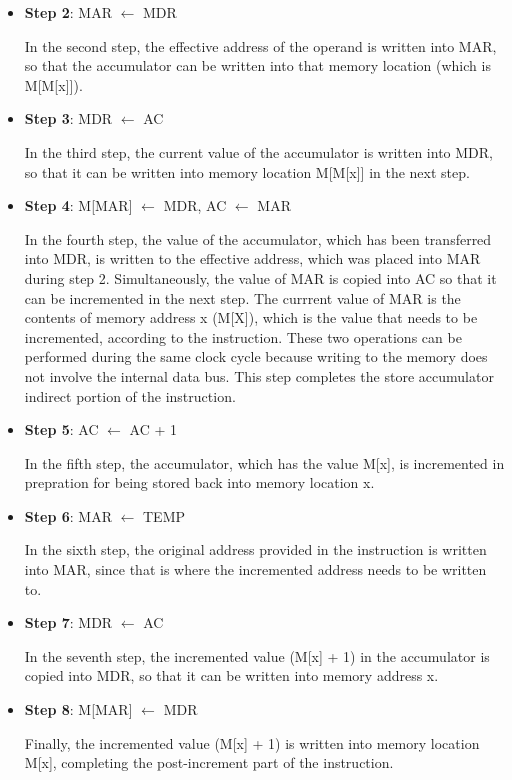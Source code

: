 \documentclass[11pt]{article}
\begin{document}
\begin{enumerate}[leftmargin=0.2in]
\begin{itemize}
  \item \textbf{Step 2}: MAR $\leftarrow$ MDR

    In the second step, the effective address of the operand is written into MAR, so that the accumulator can be written into that memory location (which is M[M[x]]).

  \item \textbf{Step 3}: MDR $\leftarrow$ AC

    In the third step, the current value of the accumulator is written into MDR, so that it can be written into memory location M[M[x]] in the next step.

  \item \textbf{Step 4}: M[MAR] $\leftarrow$ MDR, AC $\leftarrow$ MAR

    In the fourth step, the value of the accumulator, which has been transferred into MDR, is written to the effective address, which was placed into MAR during step 2. Simultaneously, the value of MAR is copied into AC so that it can be incremented in the next step. The currrent value of MAR is the contents of memory address x (M[X]), which is the value that needs to be incremented, according to the instruction. These two operations can be performed during the same clock cycle because writing to the memory does not involve the internal data bus. This step completes the store accumulator indirect portion of the instruction.

  \item \textbf{Step 5}: AC $\leftarrow$ AC + 1

    In the fifth step, the accumulator, which has the value M[x], is incremented in prepration for being stored back into memory location x.

  \item \textbf{Step 6}: MAR $\leftarrow$ TEMP

    In the sixth step, the original address provided in the instruction is written into MAR, since that is where the incremented address needs to be written to.

  \item \textbf{Step 7}: MDR $\leftarrow$ AC

    In the seventh step, the incremented value (M[x] + 1) in the accumulator is copied into MDR, so that it can be written into memory address x.

  \item \textbf{Step 8}: M[MAR] $\leftarrow$ MDR

    Finally, the incremented value (M[x] + 1) is written into memory location M[x], completing the post-increment part of the instruction.
\end{itemize}


\end{enumerate}
\end{document}
